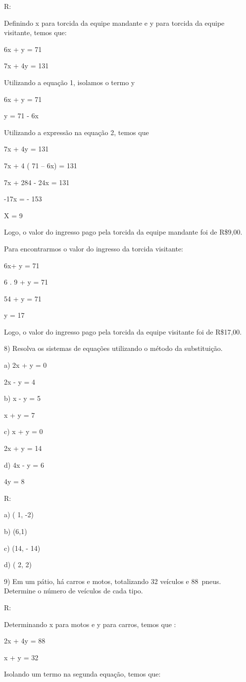 R:

Definindo x para torcida da equipe mandante e y para torcida da equipe
visitante, temos que:

6x + y = 71

7x + 4y = 131

Utilizando a equação 1, isolamos o termo y

6x + y = 71

y = 71 - 6x

Utilizando a expressão na equação 2, temos que

7x + 4y = 131

7x + 4 ( 71 -- 6x) = 131

7x + 284 - 24x = 131

-17x = - 153

X = 9

Logo, o valor do ingresso pago pela torcida da equipe mandante foi de
R\$9,00.

Para encontrarmos o valor do ingresso da torcida visitante:

6x+ y = 71

6 . 9 + y = 71

54 + y = 71

y = 17

Logo, o valor do ingresso pago pela torcida da equipe visitante foi de
R\$17,00.

8) Resolva os sistemas de equações utilizando o método da substituição.

a) 2x + y = 0

2x - y = 4

b) x - y = 5

x + y = 7

c) x + y = 0

2x + y = 14

d) 4x - y = 6

4y = 8

R:

a) ( 1, -2)

b) (6,1)

c) (14, - 14)

d) ( 2, 2)

9) Em um pátio, há carros e motos, totalizando 32 veículos e 88~pneus.
Determine o número de veículos de cada tipo.

R:

Determinando x para motos e y para carros, temos que :

2x + 4y = 88

x + y = 32

Isolando um termo na segunda equação, temos que:

